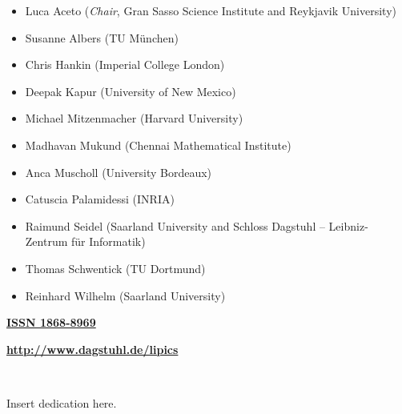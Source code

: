 \documentclass[a4paper,UKenglish]{lipicsmaster-v2016}
\begin{document}
\begin{publicationinfo}
\begin{itemize} 
\item Luca Aceto (\emph{Chair}, Gran Sasso Science Institute and Reykjavik University) 
\item Susanne Albers (TU M\"unchen)
\item Chris Hankin (Imperial College London)
\item Deepak Kapur (University of New Mexico)
\item Michael Mitzenmacher (Harvard University)
\item Madhavan Mukund	(Chennai Mathematical Institute)
\item Anca Muscholl (University Bordeaux)
\item Catuscia Palamidessi (INRIA)
\item Raimund Seidel (Saarland University and Schloss Dagstuhl -- Leibniz-Zentrum f\"ur Informatik)
\item Thomas Schwentick (TU Dortmund)
\item Reinhard Wilhelm (Saarland University)
\end{itemize}
 
\bigskip
\bigskip
\bigskip

{\large\bf\sffamily \href{http://www.dagstuhl.de/dagpub/1868-8969}{ISSN 1868-8969}}

\bigskip
\bigskip
\bigskip

{\Large\bf\sffamily \href{http://www.dagstuhl.de/lipics}{http://www.dagstuhl.de/lipics}}
 
\vfill

 
\newpage
 
\thispagestyle{empty}

\ \\

\end{publicationinfo}


\begin{dedication}%
  Insert dedication here.
\end{dedication}
\end{document}
